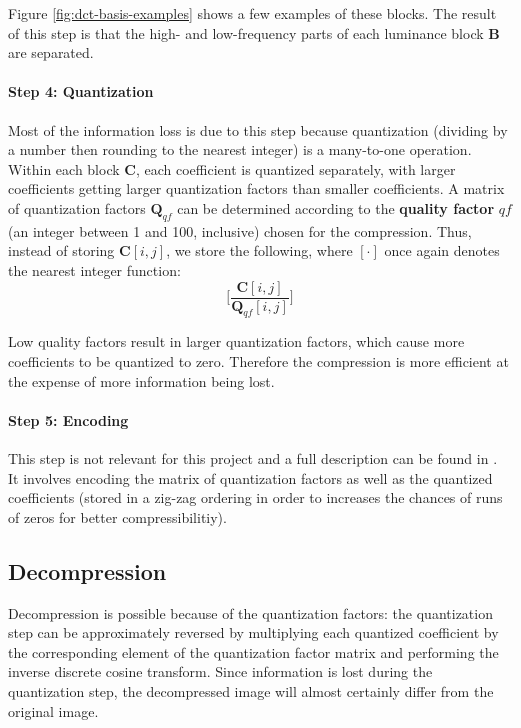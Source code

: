 \documentclass[11pt,a4paper,twoside,openright]{report}
\begin{document}
Figure \ref{fig:dct-basis-examples} shows a few examples of these blocks. The result of this step is that the high- and low-frequency parts of each luminance block $\bm{B}$ are separated.

\paragraph{Step 4: Quantization} Most of the information loss is due to this step because quantization (dividing by a number then rounding to the nearest integer) is a many-to-one operation. Within each block $\bm{C}$, each coefficient is quantized separately, with larger coefficients getting larger quantization factors than smaller coefficients. A matrix of quantization factors $\bm{Q}_{qf}$ can be determined according to the \textbf{quality factor} $qf$ (an integer between 1 and 100, inclusive) chosen for the compression. Thus, instead of storing $\bm{C}[i,j]$, we store the following, where $[ \cdot ]$ once again denotes the nearest integer function:
\begin{equation*}
	\Bigg[ \frac{\bm{C}[i,j]}{\bm{Q}_{qf}[i,j]} \Bigg]
\end{equation*}

Low quality factors result in larger quantization factors, which cause more coefficients to be quantized to zero. Therefore the compression is more efficient at the expense of more information being lost.

\paragraph{Step 5: Encoding} This step is not relevant for this project and a full description can be found in \cite{jpeg-standard}. It involves encoding the matrix of quantization factors as well as the quantized coefficients (stored in a zig-zag ordering in order to increases the chances of runs of zeros for better compressibilitiy).


\subsection{Decompression}

Decompression is possible because of the quantization factors: the quantization step can be approximately reversed by multiplying each quantized coefficient by the corresponding element of the quantization factor matrix and performing the inverse discrete cosine transform. Since information is lost during the quantization step, the decompressed image will almost certainly differ from the original image.
\end{document}
